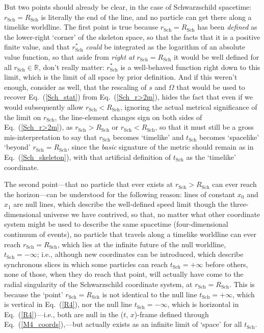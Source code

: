 But two points should already be clear, in the case of Schwarzschild spacetime: $r_{\mathrm{Sch}}=R_{\mathrm{Sch}}$ is literally the end of the line, and no particle can get there along a timelike worldline. The first point is true because $r_{\mathrm{Sch}}=R_{\mathrm{Sch}}$ has been \textit{defined} as the lower-right `corner' of the skeleton space, so that the facts that it is a positive finite value, and that $r^*_{\mathrm{Sch}}$ \textit{could} be integrated as the logarithm of an absolute value function, so that aside from \textit{right at} $r_{\mathrm{Sch}}=R_{\mathrm{Sch}}$ it would be well defined for all $r_{\mathrm{Sch}}\in\mathbb{R}$, don't really matter: $r^*_{\mathrm{Sch}}$ is a well-behaved function right down to this limit, which is the limit of all space by prior definition. And if this weren't enough, consider as well, that the rescaling of $s$ and $\Omega$ that would be used to recover Eq.~(\ref{Sch_stat}) from Eq.~(\ref{Sch_r>2m}), hides the fact that even if we would subsequently allow $r_{\mathrm{Sch}}<R_{\mathrm{Sch}}$, ignoring the actual metrical significance of the limit on $r_{\mathrm{Sch}}$, the line-element changes sign on both sides of Eq.~(\ref{Sch_r>2m}), as $r_{\mathrm{Sch}}>R_{\mathrm{Sch}}$ or $r_{\mathrm{Sch}}<R_{\mathrm{Sch}}$, so that it must still be a gross mis-interpretation to say that $r_{\mathrm{Sch}}$ becomes `timelike' and $t_{\mathrm{Sch}}$ becomes `spacelike' `beyond' $r_{\mathrm{Sch}}=R_{\mathrm{Sch}}$, since the \textit{basic} signature of the metric should remain as in Eq.~(\ref{Sch_skeleton}), with that artificial definition of $t_{\mathrm{Sch}}$ as the `timelike' coordinate.

The second point---that no particle that ever exists at $r_{\mathrm{Sch}}>R_{\mathrm{Sch}}$ can ever reach the horizon---can be understood for the following reason: lines of constant $x_0$ and $x_1$ are null lines, which describe the well-defined speed limit though the three-dimensional universe we have contrived, so that, no matter what other coordinate system might be used to describe the same spacetime (four-dimensional continuum of events), no particle that travels along a timelike worldline can ever reach $r_{\mathrm{Sch}}=R_{\mathrm{Sch}}$, which lies at the infinite future of the null worldline, $t_{\mathrm{Sch}}=-\infty$; i.e., although new coordinates can be introduced, which describe synchronous slices in which some particles can reach $t_{\mathrm{Sch}}=+\infty$ before others, none of those, when they do reach that point, will actually have come to the radial singularity of the Schwarzschild coordinate system, at $r_{\mathrm{Sch}}=R_{\mathrm{Sch}}$. This is because the `point' $r_{\mathrm{Sch}}=R_{\mathrm{Sch}}$ is not identical to the null line $t_{\mathrm{Sch}}=+\infty$, which is vertical in Eq.~(\ref{R4}), nor the null line $t_{\mathrm{Sch}}=-\infty$, which is horizontal in Eq.~(\ref{R4})---i.e., both are null in the ($t$, $x$)-frame defined through Eq.~(\ref{M4_coords}),---but actually exists as an infinite limit of `space' for all $t_{\mathrm{Sch}}$. 

